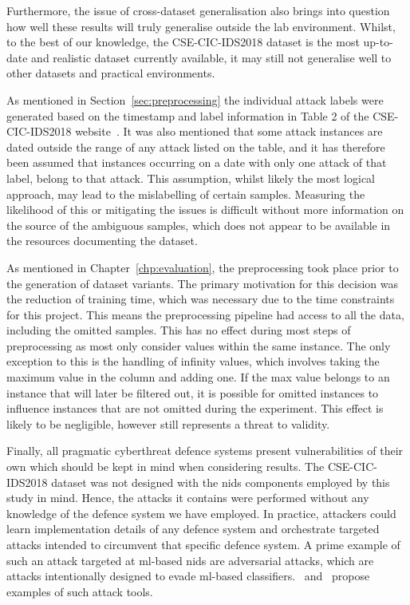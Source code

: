 Furthermore, the issue of cross-dataset generalisation also brings into
question how well these results will truly generalise outside the lab
environment. Whilst, to the best of our knowledge, the CSE-CIC-IDS2018 dataset
is the most up-to-date and realistic dataset currently available, it may still
not generalise well to other datasets and practical environments.

As mentioned in Section~\ref{sec:preprocessing} the individual attack labels
were generated based on the timestamp and label information in Table 2 of the
CSE-CIC-IDS2018 website~\cite{cic2018}. It was also mentioned that some attack
instances are dated outside the range of any attack listed on the table, and it
has therefore been assumed that instances occurring on a date with only one
attack of that label, belong to that attack. This assumption, whilst likely the
most logical approach, may lead to the mislabelling of certain samples.
Measuring the likelihood of this or mitigating the issues is difficult without
more information on the source of the ambiguous samples, which does not appear
to be available in the resources documenting the dataset.

As mentioned in Chapter~\ref{chp:evaluation}, the preprocessing took place
prior to the generation of dataset variants. The primary motivation for this
decision was the reduction of training time, which was necessary due to the
time constraints for this project. This means the preprocessing pipeline had
access to all the data, including the omitted samples. This has no effect
during most steps of preprocessing as most only consider values within the same
instance. The only exception to this is the handling of infinity values, which
involves taking the maximum value in the column and adding one. If the max
value belongs to an instance that will later be filtered out, it is possible
for omitted instances to influence instances that are not omitted during the
experiment. This effect is likely to be negligible, however still represents a
threat to validity.

Finally, all pragmatic cyberthreat defence systems present vulnerabilities of
their own which should be kept in mind when considering results. The
CSE-CIC-IDS2018 dataset was not designed with the \gls{nids} components
employed by this study in mind. Hence, the attacks it contains were performed
without any knowledge of the defence system we have employed. In practice,
attackers could learn implementation details of any defence system and
orchestrate targeted attacks intended to circumvent that specific defence
system. A prime example of such an attack targeted at \gls{ml}-based \gls{nids}
are adversarial attacks, which are attacks intentionally designed to evade
\gls{ml}-based classifiers.~\cite{adversarial1} and~\cite{adversarial2} propose
examples of such attack tools.
